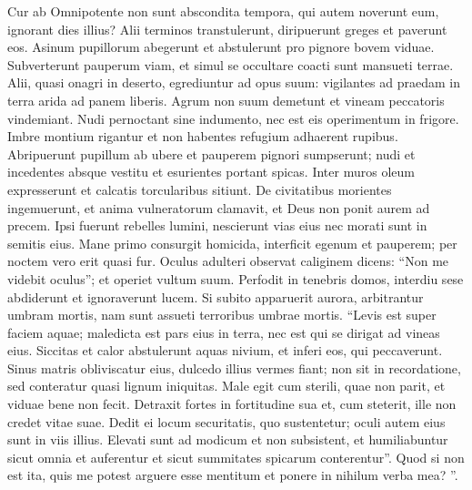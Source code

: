 \begin{biblechapter}
\begin{biblechapter}
\begin{biblechapter}
\begin{biblechapter}
\begin{biblechapter}
\begin{biblechapter}
\begin{biblechapter}
\begin{biblechapter}
\begin{biblechapter}
\begin{biblechapter}
\begin{biblechapter}
\begin{biblechapter}
\begin{biblechapter}
\begin{biblechapter}
\begin{biblechapter}
\begin{biblechapter}
\begin{biblechapter}
\begin{biblechapter}
\begin{biblechapter}
\begin{biblechapter}
\begin{biblechapter}
\begin{biblechapter}
\begin{biblechapter}
\begin{biblechapter}
\verse Cur ab Omnipotente non sunt abscondita tempora,
 qui autem noverunt eum, ignorant dies illius?
 \verse Alii terminos transtulerunt,
 diripuerunt greges et paverunt eos.
 \verse Asinum pupillorum abegerunt
 et abstulerunt pro pignore bovem viduae.
 \verse Subverterunt pauperum viam,
 et simul se occultare coacti sunt mansueti terrae.
 \verse Alii, quasi onagri in deserto,
 egrediuntur ad opus suum:
 vigilantes ad praedam
 in terra arida ad panem liberis.
 \verse Agrum non suum demetunt
 et vineam peccatoris vindemiant.
 \verse Nudi pernoctant sine indumento,
 nec est eis operimentum in frigore.
 \verse Imbre montium rigantur
 et non habentes refugium adhaerent rupibus.
 \verse Abripuerunt pupillum ab ubere
 et pauperem pignori sumpserunt;
 \verse nudi et incedentes absque vestitu
 et esurientes portant spicas.
 \verse Inter muros oleum expresserunt
 et calcatis torcularibus sitiunt.
 \verse De civitatibus morientes ingemuerunt,
 et anima vulneratorum clamavit,
 et Deus non ponit aurem ad precem.
 \verse Ipsi fuerunt rebelles lumini,
 nescierunt vias eius
 nec morati sunt in semitis eius.
 \verse Mane primo consurgit homicida,
 interficit egenum et pauperem;
 per noctem vero erit quasi fur.
 \verse Oculus adulteri observat caliginem
 dicens: “Non me videbit oculus”;
 et operiet vultum suum.
 \verse Perfodit in tenebris domos, interdiu sese abdiderunt
 et ignoraverunt lucem.
 \verse Si subito apparuerit aurora, arbitrantur umbram mortis,
 nam sunt assueti terroribus umbrae mortis.
 \verse “Levis est super faciem aquae;
 maledicta est pars eius in terra,
 nec est qui se dirigat ad vineas eius.
 \verse Siccitas et calor abstulerunt aquas nivium,
 et inferi eos, qui peccaverunt.
 \verse Sinus matris obliviscatur eius,
 dulcedo illius vermes fiant;
 non sit in recordatione,
 sed conteratur quasi lignum iniquitas.
 \verse Male egit cum sterili, quae non parit,
 et viduae bene non fecit.
 \verse Detraxit fortes in fortitudine sua
 et, cum steterit, ille non credet vitae suae.
 \verse Dedit ei locum securitatis, quo sustentetur;
 oculi autem eius sunt in viis illius.
 \verse Elevati sunt ad modicum et non subsistent,
 et humiliabuntur sicut omnia et auferentur
 et sicut summitates spicarum conterentur”.
 \verse Quod si non est ita, quis me potest arguere esse mentitum
 et ponere in nihilum verba mea? ”. 

\end{biblechapter}
\end{biblechapter}
\end{biblechapter}
\end{biblechapter}
\end{biblechapter}
\end{biblechapter}
\end{biblechapter}
\end{biblechapter}
\end{biblechapter}
\end{biblechapter}
\end{biblechapter}
\end{biblechapter}
\end{biblechapter}
\end{biblechapter}
\end{biblechapter}
\end{biblechapter}
\end{biblechapter}
\end{biblechapter}
\end{biblechapter}
\end{biblechapter}
\end{biblechapter}
\end{biblechapter}
\end{biblechapter}
\end{biblechapter}
